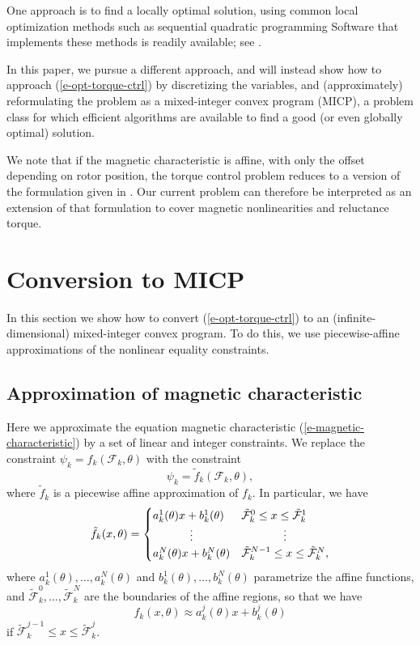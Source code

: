 \documentclass[11pt]{article}
\begin{document}
One approach is to find a locally optimal solution,
using common local optimization methods such as sequential quadratic programming
Software that implements these methods is readily available;
see \cite{nocedal2006numerical}.


In this paper, we pursue a different approach,
and will instead show how to approach (\ref{e-opt-torque-ctrl})
by discretizing the variables,
and (approximately) reformulating the problem as a mixed-integer convex program (MICP),
a problem class for which efficient algorithms are available
to find a good (or even globally optimal) solution.


We note that if the magnetic characteristic is affine,
with only the offset depending on rotor position,
the torque control problem reduces to a version of the formulation given in 
\cite{moehle2015optimal}.
Our current problem can therefore be interpreted as an extension
of that formulation to cover magnetic nonlinearities and reluctance torque.

\section{Conversion to MICP}
\label{s-micp}
In this section we show how to convert (\ref{e-opt-torque-ctrl}) to an
(infinite-dimensional) mixed-integer convex program.
To do this,
we use piecewise-affine approximations of the nonlinear equality constraints.

\subsection{Approximation of magnetic characteristic}
Here we approximate the equation magnetic characteristic
(\ref{e-magnetic-characteristic})
by a set of linear and integer constraints.
We replace the constraint 
$\psi_k = f_k(\mathcal F_k, \theta)$
with the constraint
\begin{equation}
\label{e-approx-magnetic-characteristic}
\psi_k = \tilde f_k(\mathcal F_k, \theta),
\end{equation}
where $\tilde f_k$ is a piecewise affine approximation of $f_k$.
In particular, we have
\[
\tilde f_k(x, \theta) = 
\begin{cases}
a_k^{1}(\theta) x + b_k^{1}(\theta) &
\tilde {\mathcal F}_k^{0}  \leq x \leq \tilde {\mathcal F}_k^{1} \\
\hfil \vdots  & \hfil \vdots\\
a_k^{N}(\theta) x + b_k^{N}(\theta) &
\tilde {\mathcal F}_k^{N-1}  \leq x \leq \tilde {\mathcal F}_k^{N},
\end{cases}
\]
where 
$a_k^1(\theta), \ldots, a_k^N(\theta)$
and
$b_k^1(\theta), \ldots, b_k^N(\theta)$
parametrize the affine functions, and 
$\tilde {\mathcal F}_k^0, \ldots, \tilde {\mathcal F}_k^N$
are the boundaries of the affine regions, so that we have
\[
f_k(x, \theta) \approx a_k^j(\theta) x + b_k^j(\theta)
\]
if $\tilde {\mathcal F}_k^{j-1} \leq x \leq \tilde {\mathcal F}_k^j$.
\end{document}

